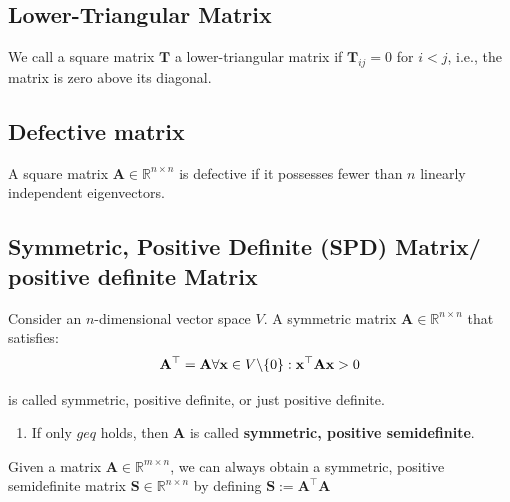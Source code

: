 
\subsection{Lower-Triangular Matrix \cite{mfml-1}}\label{Lower-Triangular Matrix}
We call a square matrix $\mathbf{T}$ a lower-triangular matrix if $\mathbf{T}_{ij} = 0$ for $i < j$, i.e., the matrix is zero above its diagonal.


\subsection{Defective matrix \cite{mfml-1}}\label{Defective matrix}
A square matrix $\mathbf{A} \in \mathbb{R}^{n\times n}$ is defective if it possesses fewer than $n$ linearly independent eigenvectors.


\subsection{Symmetric, Positive Definite (SPD) Matrix/ positive definite Matrix \cite{mfml-1}}\label{Symmetric, Positive Definite (SPD) Matrix/ positive definite Matrix}

Consider an $n$-dimensional vector space $V$. A symmetric matrix $\mathbf{A} \in \mathbb{R}^{n\times n}$ that satisfies:
\[
    \displaystyle
    \hfill
    \mathbf{A^\top = A}
    \hfill
    \forall \mathbf{x} \in V \backslash \{ 0 \} : \mathbf{x^\top A x} > 0
    \hfill
\]

is called symmetric, positive definite, or just positive definite. 

\begin{enumerate}
    \item If only $geq$ holds, then $\mathbf{A}$ is called \textbf{symmetric, positive semidefinite}.
    
\end{enumerate}

\begin{theorem}
    Given a matrix $\mathbf{A} \in \mathbb{R}^{m\times n}$, we can always obtain a symmetric, positive semidefinite matrix $\mathbf{S} \in \mathbb{R}^{n\times n}$ by defining $\mathbf{S := A^\top A}$
\end{theorem}

